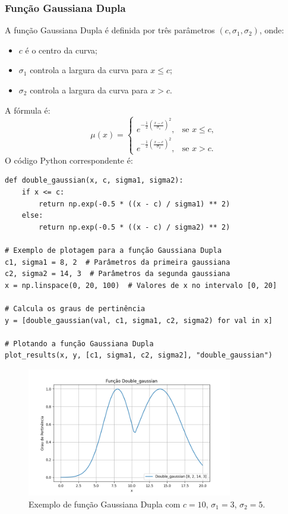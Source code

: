 \documentclass[a4paper,12pt]{article}
\begin{document}
\subsubsection{Função Gaussiana Dupla}
A função Gaussiana Dupla é definida por três parâmetros $(c, \sigma_1, \sigma_2)$, onde:
\begin{itemize}
    \item $c$ é o centro da curva;
    \item $\sigma_1$ controla a largura da curva para $x \leq c$;
    \item $\sigma_2$ controla a largura da curva para $x > c$.
\end{itemize}
A fórmula é:
\[
\mu(x) =
\begin{cases}
e^{-\frac{1}{2} \left( \frac{x - c}{\sigma_1} \right)^2}, & \text{se } x \leq c, \\
e^{-\frac{1}{2} \left( \frac{x - c}{\sigma_2} \right)^2}, & \text{se } x > c.
\end{cases}
\]
O código Python correspondente é:
\begin{verbatim}
def double_gaussian(x, c, sigma1, sigma2):
    if x <= c:
        return np.exp(-0.5 * ((x - c) / sigma1) ** 2)
    else:
        return np.exp(-0.5 * ((x - c) / sigma2) ** 2)

# Exemplo de plotagem para a função Gaussiana Dupla
c1, sigma1 = 8, 2  # Parâmetros da primeira gaussiana
c2, sigma2 = 14, 3  # Parâmetros da segunda gaussiana
x = np.linspace(0, 20, 100)  # Valores de x no intervalo [0, 20]

# Calcula os graus de pertinência
y = [double_gaussian(val, c1, sigma1, c2, sigma2) for val in x]

# Plotando a função Gaussiana Dupla
plot_results(x, y, [c1, sigma1, c2, sigma2], "double_gaussian")

\end{verbatim}
\begin{figure}[H]
    \centering
    \includegraphics[width=0.8\textwidth]{img/double_gaussian.png}
    \caption{Exemplo de função Gaussiana Dupla com $c=10$, $\sigma_1=3$, $\sigma_2=5$.}
\end{figure}
\end{document}

